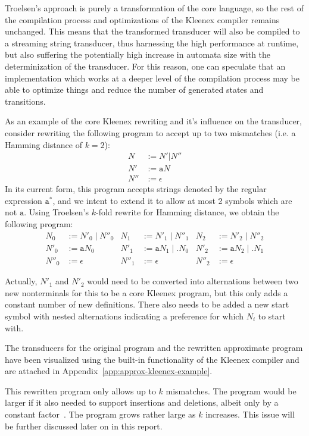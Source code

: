 Troelsen's approach is purely a transformation of the core language, so the
rest of the compilation process and optimizations of the Kleenex compiler
remains unchanged. This means that the transformed transducer will also be
compiled to a streaming string transducer, thus harnessing the high performance
at runtime, but also suffering the potentially high increase in automata size
with the determinization of the transducer. For this reason, one can speculate
that an implementation which works at a deeper level of the compilation process
may be able to optimize things and reduce the number of generated states and
transitions.


As an example of the core Kleenex rewriting and it's influence on the
transducer, consider rewriting the following program to accept up to two
mismatches (i.e. a Hamming distance of $k=2$):
\begin{align*}
  N   &:= N' | N''      \\
  N'  &:= \mathtt{a} N  \\
  N'' &:= \epsilon
\end{align*}
In its current form, this program accepts strings denoted by the regular
expression $\mathtt{a^*}$, and we intent to extend it to allow at most 2
symbols which are not $\mathtt{a}$. Using Troelsen's $k$-fold rewrite for
Hamming distance, we obtain the following program:
\begin{align*}
  N_0   &:= N'_0 \;|\; N''_0  &  N_1   &:= N'_1 \;|\; N''_1           & N_2   &:= N'_2 \;|\; N''_2           \\
  N'_0  &:= \mathtt{a} N_0    &  N'_1  &:= \mathtt{a} N_1 \;|\; . N_0 & N'_2  &:= \mathtt{a} N_2 \;|\; . N_1 \\
  N''_0 &:= \epsilon          &  N''_1 &:= \epsilon                   & N''_2 &:= \epsilon
\end{align*}

Actually, $N'_1$ and $N'_2$ would need to be converted into alternations
between two new nonterminals for this to be a core Kleenex program, but this
only adds a constant number of new definitions. There also needs to be added a
new start symbol with nested alternations indicating a preference for which
$N_i$ to start with.

The transducers for the original program and the rewritten approximate program
have been visualized using the built-in functionality of the Kleenex compiler
and are attached in Appendix~\ref{app:approx-kleenex-example}.

This rewritten program only allows up to $k$ mismatches. The program would be
larger if it also needed to support insertions and deletions, albeit only by a
constant factor~\cite{troelsen2016approximate}. The program grows rather large
as $k$ increases. This issue will be further discussed later on in this report.




